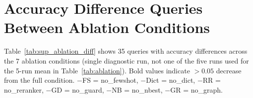 \documentclass{npj-compt.mater}
\begin{document}

\section{Accuracy Difference Queries Between Ablation Conditions}
\label{sec:sup_ablation_diff}

Table~\ref{tab:sup_ablation_diff} shows 35 queries with accuracy
differences across the 7 ablation conditions
(single diagnostic run, not one of the five runs used for the 5-run
mean in Table~\ref{tab:ablation}).
Bold values indicate $> 0.05$ decrease from the full condition.
$-$FS = no\_fewshot, $-$Dict = no\_dict, $-$RR = no\_reranker,
$-$GD = no\_guard, $-$NB = no\_nbest, $-$GR = no\_graph.
\end{document}
